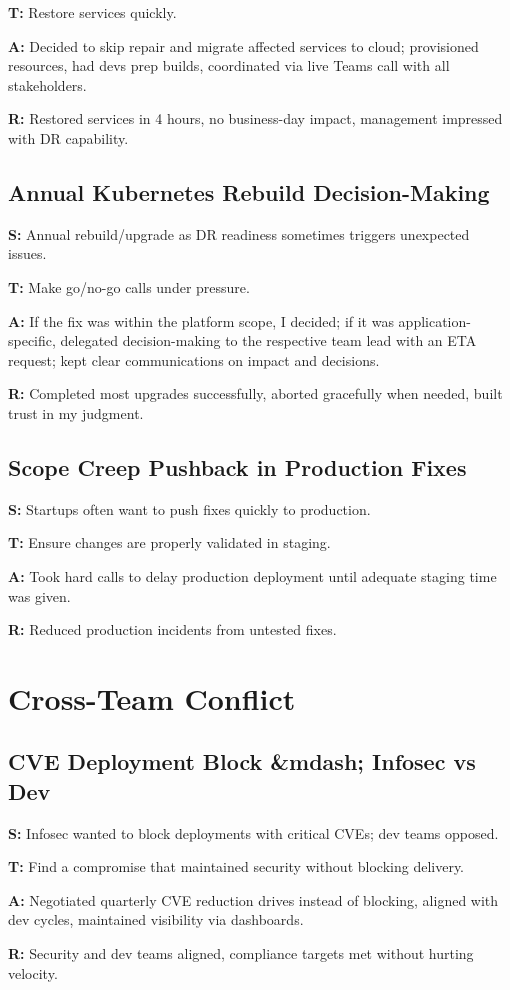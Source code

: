 \documentclass[11pt]{article}
\begin{document}
\textbf{T:} Restore services quickly.

\textbf{A:} Decided to skip repair and migrate affected services to cloud; provisioned resources, had devs prep builds, coordinated via live Teams call with all stakeholders.

\textbf{R:} Restored services in 4 hours, no business-day impact, management impressed with DR capability.

\subsection{Annual Kubernetes Rebuild Decision-Making}
\textbf{S:} Annual rebuild/upgrade as DR readiness sometimes triggers unexpected issues.

\textbf{T:} Make go/no-go calls under pressure.

\textbf{A:} If the fix was within the platform scope, I decided; if it was application-specific, delegated decision-making to the respective team lead with an ETA request; kept clear communications on impact and decisions.

\textbf{R:} Completed most upgrades successfully, aborted gracefully when needed, built trust in my judgment.

\subsection{Scope Creep Pushback in Production Fixes}
\textbf{S:} Startups often want to push fixes quickly to production.

\textbf{T:} Ensure changes are properly validated in staging.

\textbf{A:} Took hard calls to delay production deployment until adequate staging time was given.

\textbf{R:} Reduced production incidents from untested fixes.

\section{Cross-Team Conflict}

\subsection{CVE Deployment Block \&mdash; Infosec vs Dev}
\textbf{S:} Infosec wanted to block deployments with critical CVEs; dev teams opposed.

\textbf{T:} Find a compromise that maintained security without blocking delivery.

\textbf{A:} Negotiated quarterly CVE reduction drives instead of blocking, aligned with dev cycles, maintained visibility via dashboards.

\textbf{R:} Security and dev teams aligned, compliance targets met without hurting velocity.
\end{document}
